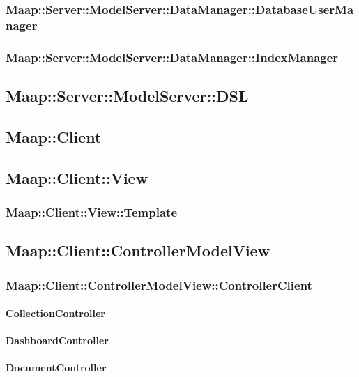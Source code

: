 \subsubsection{Maap::Server::ModelServer::DataManager::DatabaseUserManager}

\subsubsection{Maap::Server::ModelServer::DataManager::IndexManager}

\subsection{Maap::Server::ModelServer::DSL}

\subsection{Maap::Client}

\subsection{Maap::Client::View}

\subsubsection{Maap::Client::View::Template}

\subsection{Maap::Client::ControllerModelView}

\subsubsection{Maap::Client::ControllerModelView::ControllerClient}

\paragraph{CollectionController}

\paragraph{DashboardController}

\paragraph{DocumentController}


